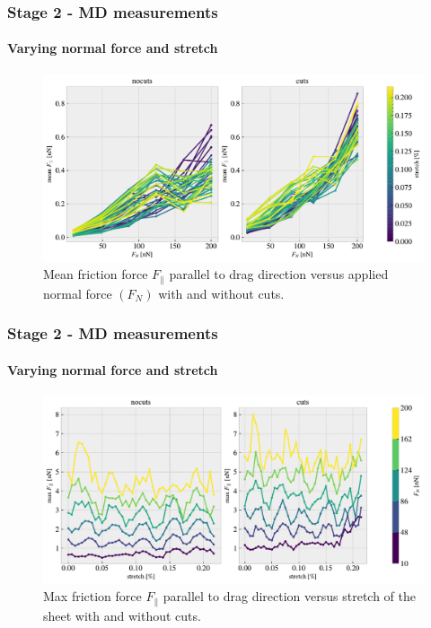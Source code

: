\documentclass[
	10pt, %
]{beamer}
\begin{document}

	


\begin{frame}
	\frametitle{Stage 2 - MD measurements}
	\framesubtitle{Varying normal force and stretch}
	\begin{figure}
		\includegraphics[width=\linewidth]{figures/multi0.pdf}
		\caption{Mean friction force $F_{\parallel}$ parallel to drag direction versus applied normal force $(F_N)$ with and without cuts.}
	\end{figure}	
\end{frame}

\begin{frame}
	\frametitle{Stage 2 - MD measurements}
	\framesubtitle{Varying normal force and stretch}
	\begin{figure}
		\includegraphics[width=\linewidth]{figures/multi1.pdf}
		\caption{Max friction force $F_{\parallel}$ parallel to drag direction versus stretch of the sheet with and without cuts.}
	\end{figure}	
\end{frame}
\end{document}
